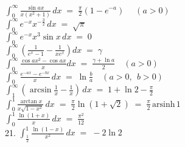 \documentclass[12pt]{article}
\theoremstyle{definition}
\begin{document}
 \; $\displaystyle\int_0^\infty\frac{\sin{ax}}{x(x^2\!+\!1)}\,dx \;=\; \frac{\pi}{2}(1-e^{-a}) \quad\; (a > 0)$\\

 \; $\displaystyle\int_0^\infty e^{-x}x^{-\frac{3}{2}}\,dx \;=\; \sqrt{\pi}$\\

 \; $\displaystyle\int_0^\infty e^{-x}x^3\sin{x}\,dx \;=\; 0$\\

 \; $\displaystyle\int_0^\infty\!\left(\frac{1}{e^x\!-\!1}-\frac{1}{xe^x}\right) dx \;=\; \gamma$\\

 \; $\displaystyle\int_0^\infty\!\frac{\cos{ax^2}-\cos{ax}}{x} dx \;=\; \frac{\gamma+\ln{a}}{2} \quad (a > 0)$\\

 \; $\displaystyle\int_0^\infty\frac{e^{-ax}\!-\!e^{-bx}}{x}\,dx \;=\; \ln\frac{b}{a} \quad (a > 0,\;\, b > 0)$\\

 \; $\displaystyle\int_1^\infty\left(\arcsin\frac{1}{x}-\frac{1}{x}\right)\,dx \;=\; 1+\ln{2}-\frac{\pi}{2}$\\

 \; $\displaystyle\int_0^1\frac{\arctan{x}}{x\sqrt{1\!-\!x^2}}\,dx 
\;=\; \frac{\pi}{2}\ln(1\!+\!\sqrt{2}) \;=\; \frac{\pi}{2}\,\mbox{arsinh}\,1$\\

 \; 
$\displaystyle\int_0^1\frac{\ln(1\!+\!x)}{x}\,dx \;=\; 
\frac{\pi^2}{12}$\\

21. \; $\displaystyle\int_{\frac{1}{2}}^1\frac{\ln(1\!-\!x)}{x^2}\,dx \;=\; -2\ln{2}$\\
\end{document}
